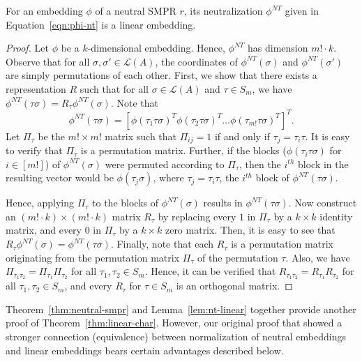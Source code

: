 \documentclass[prodmode]{acmsmall-ec14}
\newcommand{\calL}{{\mathcal{L}}}
\newcommand{\rank}{{\calL(A)}}
\newcommand{\nt}{NT}
\begin{document}
\begin{lemma}
For an embedding $\phi$ of a neutral SMPR $r$, its neutralization $\phi^{\nt}$ given in Equation~\eqref{eqn:phi-nt} is a linear embedding.
\label{lem:nt-linear}
\end{lemma}
\begin{proof}
Let $\phi$ be a $k$-dimensional embedding. Hence, $\phi^{\nt}$ has dimension $m! \cdot k$. Observe that for all $\sigma,\sigma' \in \rank$, the coordinates of $\phi^{\nt}(\sigma)$ and $\phi^{\nt}(\sigma')$ are simply permutations of each other. First, we show that there exists a representation $R$ such that for all $\sigma \in \rank$ and $\tau \in S_m$, we have $\phi^{\nt}(\tau \sigma) = R_{\tau}\phi^{\nt}(\sigma)$. Note that 
$$
\phi^{\nt}(\tau \sigma) = [\phi(\tau_1 \tau \sigma)^T \phi(\tau_2 \tau \sigma)^T \ldots \phi(\tau_{m!} \tau \sigma)^T]^T.
$$
Let $\Pi_{\tau}$ be the $m! \times m!$ matrix such that $\Pi_{ij} = 1$ if and only if $\tau_j = \tau_i \tau$. It is easy to verify that $\Pi_{\tau}$ is a permutation matrix. Further, if the blocks ($\phi(\tau_i \tau \sigma)$ for $i \in [m!]$) of $\phi^{\nt}(\sigma)$ were permuted according to $\Pi_{\tau}$, then the $i^{th}$ block in the resulting vector would be $\phi(\tau_j \sigma)$, where $\tau_j = \tau_i \tau$, the $i^{th}$ block of $\phi^{\nt}(\tau \sigma)$. 

Hence, applying $\Pi_{\tau}$ to the blocks of $\phi^{\nt}(\sigma)$ results in $\phi^{\nt}(\tau \sigma)$. Now construct an $(m! \cdot k) \times (m! \cdot k)$ matrix $R_{\tau}$ by replacing every $1$ in $\Pi_{\tau}$ by a $k\times k$ identity matrix, and every $0$ in $\Pi_{\tau}$ by a $k\times k$ zero matrix. Then, it is easy to see that $R_{\tau} \phi^{\nt}(\sigma) = \phi^{\nt}(\tau \sigma)$. Finally, note that each $R_{\tau}$ is a permutation matrix originating from the permutation matrix $\Pi_{\tau}$ of the permutation $\tau$. Also, we have $\Pi_{\tau_1 \tau_2} = \Pi_{\tau_1} \Pi_{\tau_2}$ for all $\tau_1,\tau_2 \in S_m$. Hence, it can be verified that $R_{\tau_1 \tau_2} = R_{\tau_1} R_{\tau_2}$ for all $\tau_1,\tau_2 \in S_m$, and every $R_{\tau}$ for $\tau \in S_m$ is an orthogonal matrix.
\end{proof}

Theorem~\ref{thm:neutral-smpr} and Lemma~\ref{lem:nt-linear} together provide another proof of Theorem~\ref{thm:linear-char}. However, our original proof that showed a stronger connection (equivalence) between normalization of neutral embeddings and linear embeddings bears certain advantages described below.
\end{document}
